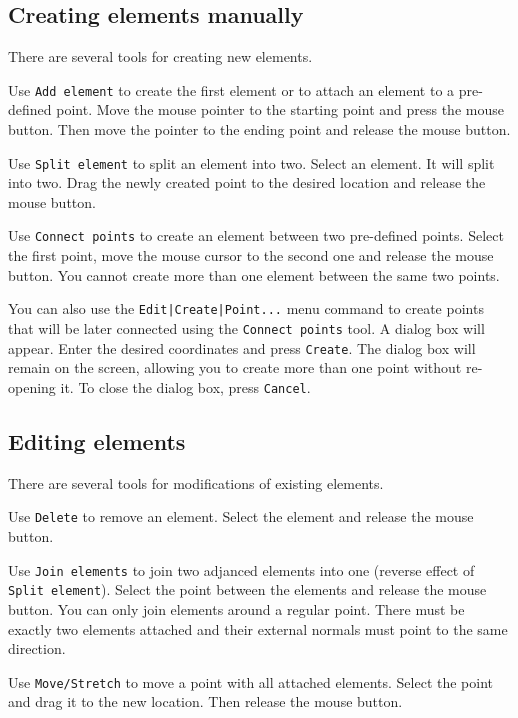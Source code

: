 \documentclass[a4paper,10pt]{report}
\begin{document}
\subsection{Creating elements manually}

There are several tools for creating new elements.

Use {\tt Add element} to create the first element or to attach an element to
a pre-defined point. Move the mouse pointer to the starting point and
press the mouse button. Then move the pointer to the ending point and
release the mouse button.

Use {\tt Split element} to split an element into two. Select an
element. It will split into two. Drag the newly created point to the
desired location and release the mouse button.

Use {\tt Connect points} to create an element between two pre-defined
points. Select the first point, move the mouse cursor to the second
one and release the mouse button. You cannot create more than one
element between the same two points.

You can also use the {\tt Edit|Create|Point...} menu command to
create points that will be later connected using the {\tt Connect points}
tool. A dialog box will appear. Enter the desired coordinates and
press {\tt Create}. The dialog box will remain on the screen, allowing you
to create more than one point without re-opening it. To close the
dialog box, press {\tt Cancel}.

\subsection{Editing elements}

There are several tools for modifications of existing elements.

Use {\tt Delete} to remove an element. Select the element and release the
mouse button.

Use {\tt Join elements} to join two adjanced elements into one
(reverse effect of {\tt Split element}). Select the point between the
elements and release the mouse button. You can only join elements
around a regular point. There must be exactly two elements attached
and their external normals must point to the same direction.

Use {\tt Move/Stretch} to move a point with all attached elements.
Select the point and drag it to the new location. Then release the
mouse button.
\end{document}
